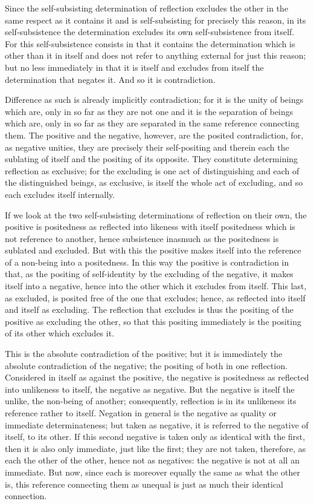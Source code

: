 Since the self-subsisting determination of reflection
excludes the other in the same respect as it contains it
and is self-subsisting for precisely this reason,
in its self-subsistence the determination excludes
its own self-subsistence from itself.
For this self-subsistence consists in
that it contains the determination
which is other than it in itself
and does not refer to anything external
for just this reason;
but no less immediately in that
it is itself and excludes from itself
the determination that negates it.
And so it is contradiction.

Difference as such is already implicitly contradiction;
for it is the unity of beings which are,
only in so far as they are not one
and it is the separation of beings which are,
only in so far as they are separated
in the same reference connecting them.
The positive and the negative, however,
are the posited contradiction,
for, as negative unities,
they are precisely their self-positing
and therein each the sublating of itself
and the positing of its opposite.
They constitute determining reflection as exclusive;
for the excluding is one act of distinguishing
and each of the distinguished beings,
as exclusive, is itself the whole act of excluding,
and so each excludes itself internally.

If we look at the two self-subsisting
determinations of reflection on their own,
the positive is positedness as reflected
into likeness with itself
positedness which is not reference to another,
hence subsistence inasmuch as
the positedness is sublated and excluded.
But with this the positive makes itself
into the reference of a non-being into a positedness.
In this way the positive is contradiction in that,
as the positing of self-identity by the
excluding of the negative,
it makes itself into a negative,
hence into the other
which it excludes from itself.
This last, as excluded, is posited
free of the one that excludes;
hence, as reflected into itself and itself as excluding.
The reflection that excludes is thus
the positing of the positive as excluding the other,
so that this positing immediately is
the positing of its other which excludes it.

This is the absolute contradiction of the positive;
but it is immediately the absolute contradiction of the negative;
the positing of both in one reflection.
Considered in itself as against the positive,
the negative is positedness as reflected into unlikeness to itself,
the negative as negative.
But the negative is itself the unlike,
the non-being of another;
consequently, reflection is in its unlikeness
its reference rather to itself.
Negation in general is the negative
as quality or immediate determinateness;
but taken as negative, it is referred to
the negative of itself, to its other.
If this second negative is taken only
as identical with the first,
then it is also only immediate,
just like the first;
they are not taken, therefore,
as each the other of the other,
hence not as negatives:
the negative is not at all an immediate.
But now, since each is moreover equally
the same as what the other is,
this reference connecting them as unequal
is just as much their identical connection.

